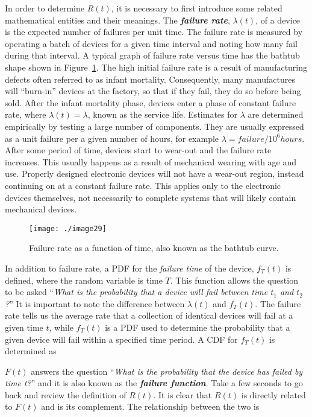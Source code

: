 In order to determine $R(t)$, it is necessary to first introduce
some related mathematical entities and their meanings. The
\emph{\textbf{failure rate}}, $\lambda(t)$, of a device is the expected
number of failures per unit time. The failure rate is measured by
operating a batch of devices for a given time interval and noting how
many fail during that interval. A typical graph of failure rate versus
time has the bathtub shape shown in Figure~\ref{figure:bathtubFunction}. 
The high initial failure
rate is a result of manufacturing defects often referred to as infant
mortality. Consequently, many manufactures will ``burn-in'' devices at
the factory, so that if they fail, they do so before being sold. After
the infant mortality phase, devices enter a phase of constant failure
rate, where $\lambda(t) = \lambda$, known as the service life. Estimates for
$\lambda$ are determined empirically by testing a large number of
components. They are usually expressed as a unit failure per a given
number of hours, for example $\lambda  = failure/10^6 hours$.
After some period of time, devices start to wear-out and the failure
rate increases. This usually happens as a result of mechanical wearing
with age and use. Properly designed electronic devices will not have a
wear-out region, instead continuing on at a constant failure rate. This
applies only to the electronic devices themselves, not necessarily to
complete systems that will likely contain mechanical devices.

\begin{figure}
\texttt{[image: ./image29]}
\caption{Failure rate as a function of time, also known as
the bathtub curve.}
\label{figure:bathtubFunction}
\end{figure}

In addition to failure rate, a PDF for the \emph{failure time} of the
device, $f_T(t)$ is defined, where the
random variable is time $T$. This function allows the question to
be asked ``\emph{What is the probability that a device will fail between
time $t_1$ and $t_2$?}'' It is important to
note the difference between $\lambda(t)$ and
$f_T(t)$. The failure rate tells us the
average rate that a collection of identical devices will fail at a given
time $t$, while $f_T(t)$ is a PDF
used to determine the probability that a given device will fail within a
specified time period. A CDF for $f_T(t)$
is determined as



$F(t)$ answers the question ``\emph{What is the probability that
the device has failed by time t?}'' and it is also known as the
\emph{\textbf{failure function}}. Take a few seconds to go back and
review the definition of $R(t)$. It is clear that $R(t)$ is
directly related to $F(t)$ and is its complement. The relationship
between the two is

